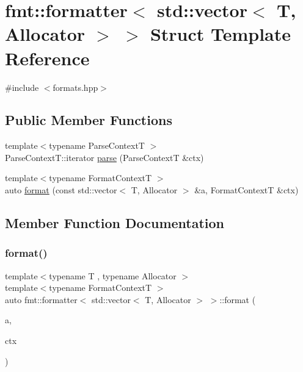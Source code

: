 \hypertarget{structfmt_1_1formatter_3_01std_1_1vector_3_01_t_00_01_allocator_01_4_01_4}{}\section{fmt\+:\+:formatter$<$ std\+:\+:vector$<$ T, Allocator $>$ $>$ Struct Template Reference}
\label{structfmt_1_1formatter_3_01std_1_1vector_3_01_t_00_01_allocator_01_4_01_4}


{\ttfamily \#include $<$formats.\+hpp$>$}

\subsection*{Public Member Functions}
\begin{DoxyCompactItemize}
\item 
{\footnotesize template$<$typename Parse\+ContextT $>$ }\\Parse\+Context\+T\+::iterator \mbox{\hyperlink{structfmt_1_1formatter_3_01std_1_1vector_3_01_t_00_01_allocator_01_4_01_4_a18a2ffb66289d4dd0543bacdfa656aaf}{parse}} (Parse\+ContextT \&ctx)
\item 
{\footnotesize template$<$typename Format\+ContextT $>$ }\\auto \mbox{\hyperlink{structfmt_1_1formatter_3_01std_1_1vector_3_01_t_00_01_allocator_01_4_01_4_adf976e467856d81ae4c470c85e02432e}{format}} (const std\+::vector$<$ T, Allocator $>$ \&a, Format\+ContextT \&ctx)
\end{DoxyCompactItemize}


\subsection{Member Function Documentation}
\mbox{\label{structfmt_1_1formatter_3_01std_1_1vector_3_01_t_00_01_allocator_01_4_01_4_adf976e467856d81ae4c470c85e02432e}} 
\subsubsection{\texorpdfstring{format()}{format()}}
{\footnotesize\ttfamily template$<$typename T , typename Allocator $>$ \\
template$<$typename Format\+ContextT $>$ \\
auto fmt\+::formatter$<$ std\+::vector$<$ T, Allocator $>$ $>$\+::format (\begin{DoxyParamCaption}\item[{const std\+::vector$<$ T, Allocator $>$ \&}]{a,  }\item[{Format\+ContextT \&}]{ctx }\end{DoxyParamCaption})}

